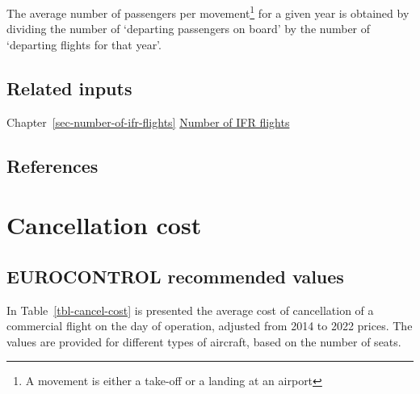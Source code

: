\documentclass[
  11pt,
  a4paper,
]{book}
\begin{document}
The average number of passengers per movement\footnote{A movement is
  either a take-off or a landing at an airport} for a given year is
obtained by dividing the number of `departing passengers on board' by
the number of `departing flights for that year'.

\hypertarget{related-inputs-10}{%
\section{Related inputs}\label{related-inputs-10}}

Chapter~\ref{sec-number-of-ifr-flights}
\protect\hyperlink{sec-number-of-ifr-flights}{Number of IFR flights}

\hypertarget{references-13}{%
\section{References}\label{references-13}}

\hypertarget{sec-cancellation-cost}{%
\chapter{Cancellation cost}\label{sec-cancellation-cost}}

\hypertarget{eurocontrol-recommended-values-11}{%
\section{EUROCONTROL recommended
values}\label{eurocontrol-recommended-values-11}}

In Table~\ref{tbl-cancel-cost} is presented the average cost of
cancellation of a commercial flight on the day of operation, adjusted
from 2014 to 2022 prices. The values are provided for different types of
aircraft, based on the number of seats.
\end{document}
